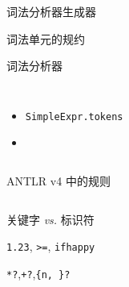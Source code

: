 
\begin{frame}{}
  \begin{center}
    词法分析器生成器
  \end{center}
\end{frame}

\begin{frame}{}
  \begin{center}
     词法单元的规约

    \vspace{0.50cm}
    \texttt{}

    \vspace{1.00cm}
     词法分析器

    \begin{columns}
        \begin{itemize}
          \setlength{\itemsep}{8pt}
          \item \texttt{SimpleExpr.tokens}
          \item \texttt{}
        \end{itemize}
    \end{columns}


  \end{center}
\end{frame}

\begin{frame}{}
\end{frame}

\begin{frame}{}
  \begin{center}
    ANTLR v4 中的规则

  \vspace{1.20cm}
	\begin{columns}[]
	  \begin{description}[最前优先匹配:]
		\setlength{\itemsep}{15pt}
      \item[最前优先匹配:] 关键字 \emph{vs.} 标识符
      \item[最长优先匹配:] \texttt{1.23}, \texttt{>=}, \texttt{ifhappy}
      \item[非贪婪匹配:] \texttt{*?},\quad \texttt{+?},\quad \texttt{\{n, \}?}
	  \end{description}
	\end{columns}
  \end{center}
\end{frame}

